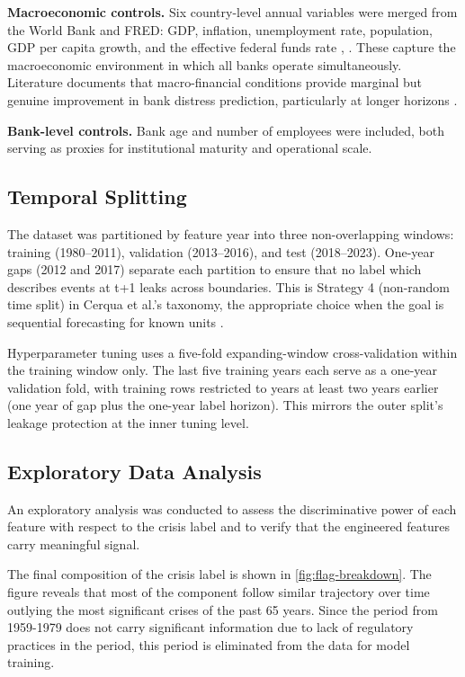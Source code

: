 \documentclass[conference]{IEEEtran}
\begin{document}
\textbf{Macroeconomic controls.} Six country-level annual variables were merged from the World Bank and FRED: GDP, inflation, unemployment rate, population, GDP per capita growth, and the effective federal funds rate \cite{b26}, \cite{b27}. These capture the macroeconomic environment in which all banks operate simultaneously. Literature documents that macro-financial conditions provide marginal but genuine improvement in bank distress prediction, particularly at longer horizons \cite{b2}. 

\textbf{Bank-level controls.} Bank age and number of employees were included, both serving as proxies for institutional maturity and operational scale.

\subsection{Temporal Splitting}
The dataset was partitioned by feature year into three non-overlapping windows: training (1980–2011), validation (2013–2016), and test (2018–2023). One-year gaps (2012 and 2017) separate each partition to ensure that no label which describes events at t+1 leaks across boundaries. This is Strategy 4 (non-random time split) in Cerqua et al.'s taxonomy, the appropriate choice when the goal is sequential forecasting for known units \cite{b5}.

Hyperparameter tuning uses a five-fold expanding-window cross-validation within the training window only. The last five training years each serve as a one-year validation fold, with training rows restricted to years at least two years earlier (one year of gap plus the one-year label horizon). This mirrors the outer split's leakage protection at the inner tuning level.

\subsection{Exploratory Data Analysis}
An exploratory analysis was conducted to assess the discriminative power of each feature with respect to the crisis label and to verify that the engineered features carry meaningful signal.

The final composition of the crisis label is shown in \ref{fig:flag-breakdown}. The figure reveals that most of the component follow similar trajectory over time outlying the most significant crises of the past 65 years. Since the period from 1959-1979 does not carry significant information due to lack of regulatory practices in the period, this period is eliminated from the data for model training.
\end{document}

